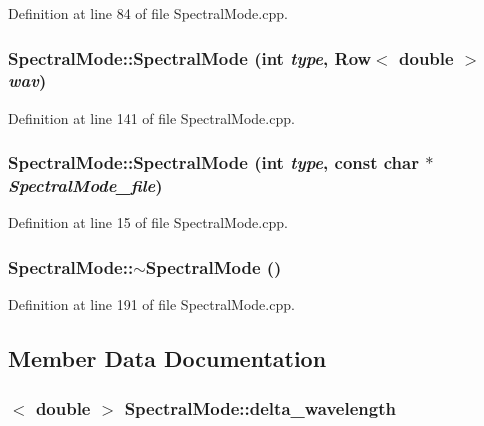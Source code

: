 Definition at line 84 of file SpectralMode.cpp.

\hypertarget{classSpectralMode_a9511acf327e4119cbb9d10e6a24276d5}{
\subsubsection[{SpectralMode}]{\setlength{\rightskip}{0pt plus 5cm}SpectralMode::SpectralMode (int {\em type}, \/  {\bf Row}$<$ double $>$ {\em wav})}}
\label{classSpectralMode_a9511acf327e4119cbb9d10e6a24276d5}


Definition at line 141 of file SpectralMode.cpp.

\hypertarget{classSpectralMode_aab85eb7484d260cc3d4c76e2d44ee2d9}{
\subsubsection[{SpectralMode}]{\setlength{\rightskip}{0pt plus 5cm}SpectralMode::SpectralMode (int {\em type}, \/  const char $\ast$ {\em SpectralMode\_\-file})}}
\label{classSpectralMode_aab85eb7484d260cc3d4c76e2d44ee2d9}


Definition at line 15 of file SpectralMode.cpp.

\hypertarget{classSpectralMode_a8f6ff593021e7d0e175b528c94896a6b}{
\subsubsection[{$\sim$SpectralMode}]{\setlength{\rightskip}{0pt plus 5cm}SpectralMode::$\sim$SpectralMode ()}}
\label{classSpectralMode_a8f6ff593021e7d0e175b528c94896a6b}


Definition at line 191 of file SpectralMode.cpp.



\subsection{Member Data Documentation}
\hypertarget{classSpectralMode_af4835d0dd1c5276798e400f3bcfa1bb7}{
\subsubsection[{delta\_\-wavelength}]{$<$ double $>$ {\bf SpectralMode::delta\_\-wavelength}}}
\label{classSpectralMode_af4835d0dd1c5276798e400f3bcfa1bb7}


